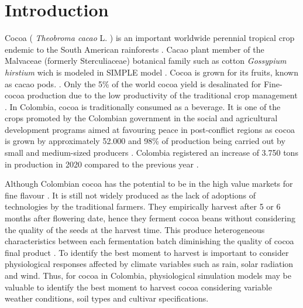 \documentclass[gene,journal,article,submit,moreauthors,pdftex]{Definitions/mdpi}
\begin{document}

\section{Introduction}

Cocoa ( \textit{Theobroma cacao }L. ) is an important worldwide perennial tropical crop endemic to the South American rainforests \citep{zuidema2005, motamayor2002, argout2011, Rodriguez2019}. Cacao plant member of the Malvaceae (formerly Sterculiaceae)  botanical family such as  cotton \textit{ Gossypium hirstium} \citep{Nix2017cotton} wich is modeled in SIMPLE model \citep{Zao2019simple}. Cocoa is grown for its fruits, known as cacao pods.  \citep{ Niemenak2010, suarez2021}. Only the 5\% of the world cocoa yield is desalinated for Fine-cocoa production due to the low productivity of  the traditional crop management \citep{argout2011}.  In Colombia, cocoa  is  traditionally  consumed  as  a  beverage. It is one of the crops promoted by the Colombian government in the social and agricultural development  programs aimed at favouring peace in post-conflict regions \citep{Rodriguez2019, Abbott2019} as cocoa is grown by approximately 52.000 \citep{Gutierrez2020} and 98\% of production being carried out by small and medium-sized producers \citep{Garcia2014, Escobar2020}. Colombia registered an increase of 3.750 tons in production in 2020 compared to the previous year \citep{lamos2020}. 

Although Colombian cocoa has the potential to be in the high value markets for fine flavour \citep{Escobar2020}. It is still not widely produced as the lack of adoptions of technologies by the traditional farmers. They empirically harvest after 5 or 6 months after flowering date, hence they ferment cocoa beans without considering the  quality of the seeds at the harvest time. This produce heterogeneous characteristics between each fermentation batch diminishing the quality of cocoa final product \citep{Escobar2021}. To identify the best moment to harvest is important to consider physiological responses affected by climate variables such as rain, solar radiation and wind.  Thus,  for cocoa in Colombia, physiological simulation models may be valuable to identify the best moment to harvest cocoa considering variable weather conditions, soil types and cultivar specifications. 
\end{document}

